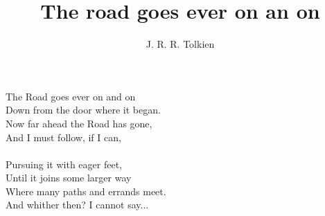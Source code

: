 \documentclass{article}
\author{J. R. R. Tolkien}
\title{The road goes ever on an on}
\date{}
\begin{document}
\maketitle

\begin{Verse}

\Vstars

The Road goes ever on and on\\
Down from the door where it began.\\
Now far ahead the Road has gone,\\
And I must follow, if I can,\\
\\
Pursuing it with eager feet,\\
Until it joins some larger way\\
Where many paths and errands meet.\\
And whither then? I cannot say...\\
\\

\end{Verse}
\end{document}
